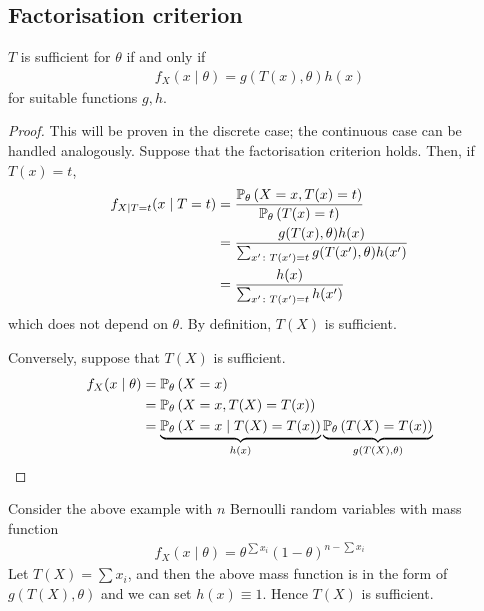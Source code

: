 \subsection{Factorisation criterion}
\begin{theorem}
	$T$ is sufficient for $\theta$ if and only if
	\begin{align*}
		f_X(x \mid \theta) = g(T(x), \theta) h(x)
	\end{align*}
	for suitable functions $g,h$.
\end{theorem}
\begin{proof}
	This will be proven in the discrete case; the continuous case can be handled analogously.
	Suppose that the factorisation criterion holds.
	Then, if $T(x) = t$,
	\begin{align*}
		f_{X \mid T = t}(x \mid T = t) & = \frac{\mathbb{P}_{\theta}\left({X = x, T(x) = t}\right)}{\mathbb{P}_{\theta}\left({T(x) = t}\right)}             \\
		                               & = \frac{g(T(x),\theta)h(x)}{\sum_{x' \colon T(x') = t} g(T(x'),\theta)h(x')} \\
		                               & = \frac{h(x)}{\sum_{x' \colon T(x') = t} h(x')}
	\end{align*}
	which does not depend on $\theta$.
	By definition, $T(X)$ is sufficient.

	Conversely, suppose that $T(X)$ is sufficient.
	\begin{align*}
		f_X(x \mid \theta) & = \mathbb{P}_{\theta}\left({X = x}\right)                                                                                                \\
		                   & = \mathbb{P}_{\theta}\left({X = x, T(X) = T(x)}\right)                                                                                   \\
		                   & = \underbrace{\mathbb{P}_{\theta}\left({X = x \mid T(X) = T(x)}\right)}_{h(x)} \underbrace{\mathbb{P}_{\theta}\left({T(X) = T(x)}\right)}_{g(T(X), \theta)}
	\end{align*}
\end{proof}
\begin{example}
	Consider the above example with $n$ Bernoulli random variables with mass function
	\begin{align*}
		f_X(x \mid \theta) = \theta^{\sum x_i} (1-\theta)^{n - \sum x_i}
	\end{align*}
	Let $T(X) = \sum x_i$, and then the above mass function is in the form of $g(T(X), \theta)$ and we can set $h(x) \equiv 1$.
	Hence $T(X)$ is sufficient.
\end{example}
